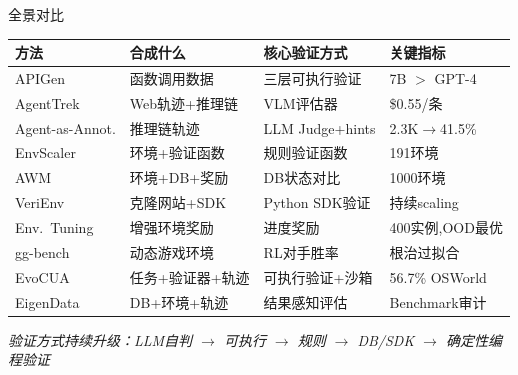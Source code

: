 \documentclass[aspectratio=169, 11pt]{beamer}
\begin{document}
\begin{frame}{全景对比}
\centering
\scriptsize
\begin{tabular}{@{}llll@{}}
\toprule
\textbf{方法} & \textbf{合成什么} & \textbf{核心验证方式} & \textbf{关键指标} \\
\midrule
APIGen & 函数调用数据 & 三层可执行验证 & 7B $>$ GPT-4 \\
AgentTrek & Web轨迹+推理链 & VLM评估器 & \$0.55/条 \\
Agent-as-Annot. & 推理链轨迹 & LLM Judge+hints & 2.3K$\rightarrow$41.5\% \\
EnvScaler & 环境+验证函数 & 规则验证函数 & 191环境 \\
AWM & 环境+DB+奖励 & DB状态对比 & 1000环境 \\
VeriEnv & 克隆网站+SDK & Python SDK验证 & 持续scaling \\
Env.\ Tuning & 增强环境奖励 & 进度奖励 & 400实例,OOD最优 \\
gg-bench & 动态游戏环境 & RL对手胜率 & 根治过拟合 \\
EvoCUA & 任务+验证器+轨迹 & 可执行验证+沙箱 & 56.7\% OSWorld \\
EigenData & DB+环境+轨迹 & 结果感知评估 & Benchmark审计 \\
\bottomrule
\end{tabular}

\vspace{8pt}
\small
\textit{验证方式持续升级：LLM自判 $\rightarrow$ 可执行 $\rightarrow$ 规则 $\rightarrow$ DB/SDK $\rightarrow$ 确定性编程验证}
\end{frame}
\end{document}
